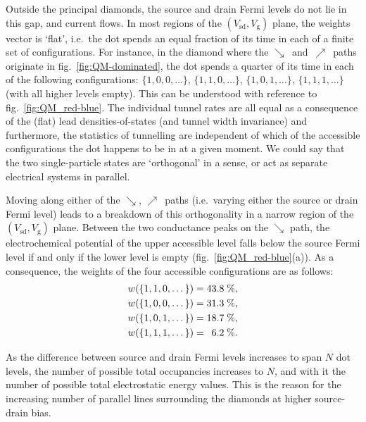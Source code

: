 \documentclass[a4paper,11pt]{article}
\begin{document}
    Outside the principal diamonds, the source and drain Fermi levels do not lie in this gap, and current flows. In most regions of the $\left(V_\mathrm{sd},V_\mathrm{g}\right)$ plane, the weights vector is `flat', i.e.\ the dot spends an equal fraction of its time in each of a finite set of configurations. For instance, in the diamond where the {\color{magenta}$\searrow$}~and~{\color{cyan}$\nearrow$}~paths originate in fig.~\ref{fig:QM-dominated}, the dot spends a quarter of its time in each of the following configurations: $\{1,0,0,\dots\}$, $\{1,1,0,\dots\}$, $\{1,0,1,\dots\}$, $\{1,1,1,\dots\}$ (with all higher levels empty). This can be understood with reference to fig.~\ref{fig:QM_red-blue}. The individual tunnel rates are all equal as a consequence of the (flat) lead densities-of-states (and tunnel width invariance) and furthermore, the statistics of tunnelling are independent of which of the accessible configurations the dot happens to be in at a given moment. We could say that the two single-particle states are `orthogonal' in a sense, or act as separate electrical systems in parallel.

    Moving along either of the {\color{magenta}$\searrow$}, {\color{cyan}$\nearrow$}~paths (i.e.\ varying either the source or drain Fermi level) leads to a breakdown of this orthogonality in a narrow region of the $\left(V_\mathrm{sd},V_\mathrm{g}\right)$ plane. Between the two conductance peaks on the {\color{magenta}$\searrow$} path, the electrochemical potential of the upper accessible level falls below the source Fermi level if and only if the lower level is empty (fig.~\ref{fig:QM_red-blue}(a)). As a consequence, the weights of the four accessible configurations are as follows:
    \begin{align*}
        w{\left(\{1,1,0,\dots\}\right)} = 43.8\;\%,\\
        w{\left(\{1,0,0,\dots\}\right)} = 31.3\;\%,\\
        w{\left(\{1,0,1,\dots\}\right)} = 18.7\;\%,\\
        w{\left(\{1,1,1,\dots\}\right)} = {\color{white}0}6.2\;\%.
    \end{align*}

    As the difference between source and drain Fermi levels increases to span $N$ dot levels, the number of possible total occupancies increases to $N$, and with it the number of possible total electrostatic energy values. This is the reason for the increasing number of parallel lines surrounding the diamonds at higher source-drain bias.
\end{document}
